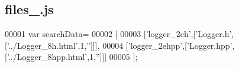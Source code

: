 \subsection{files\+\_.\+js}
\label{files__4_8js_source}

\begin{DoxyCode}
00001 var searchData=
00002 [
00003   [\textcolor{stringliteral}{'logger\_2eh'},[\textcolor{stringliteral}{'Logger.h'},[\textcolor{stringliteral}{'../Logger\_8h.html'},1,\textcolor{stringliteral}{''}]]],
00004   [\textcolor{stringliteral}{'logger\_2ehpp'},[\textcolor{stringliteral}{'Logger.hpp'},[\textcolor{stringliteral}{'../Logger\_8hpp.html'},1,\textcolor{stringliteral}{''}]]]
00005 ];
\end{DoxyCode}

